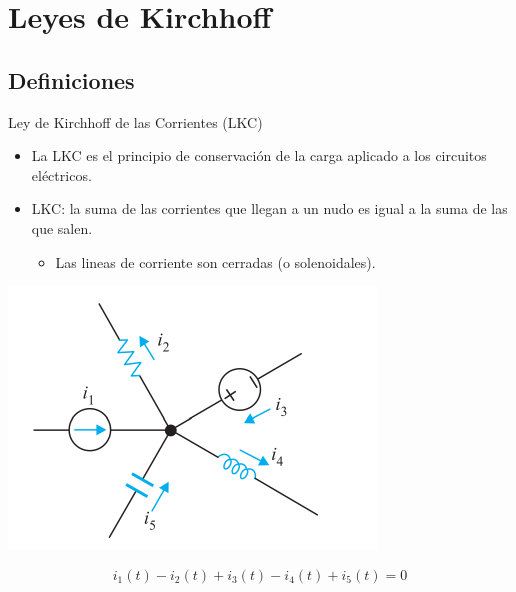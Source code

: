 \documentclass[xcolor={usenames,svgnames,dvipsnames}]{beamer}
\begin{document}
\section{Leyes de Kirchhoff}
\label{sec:orgf501413}

\subsection{Definiciones}
\label{sec:orgd7792c1}
\begin{frame}[label={sec:org1223f6c}]{Ley de Kirchhoff de las Corrientes (LKC)}
\begin{itemize}
\item La \alert{LKC} es el principio de conservación de la carga aplicado a los circuitos eléctricos.

\item \alert{LKC}: la suma de las corrientes que llegan a un nudo es igual a la suma de las que salen.

\begin{itemize}
\item Las lineas de corriente son cerradas (o solenoidales).
\end{itemize}
\end{itemize}

\begin{center}
\includegraphics[height=0.4\textheight]{figs/LKC_FM.pdf}
\end{center}
\[
i_1(t) - i_2(t) + i_3(t) - i_4(t) + i_5(t) = 0
\]
\end{frame}
\end{document}
